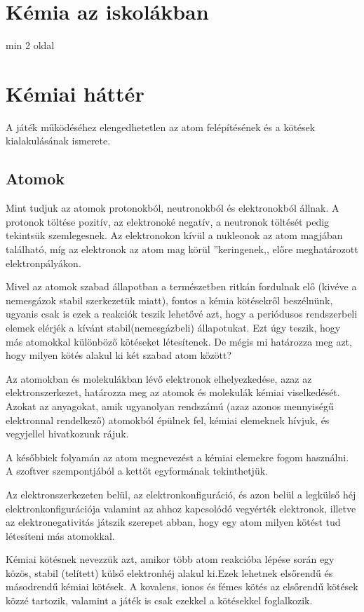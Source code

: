 \documentclass[colorlinks]{thesis-ekf}
\theoremstyle{definition}
\theoremstyle{remark}
\begin{document}
\chapter{Kémia az iskolákban}

min 2 oldal

\chapter{Kémiai háttér}

A játék működéséhez elengedhetetlen az atom felépítésének és a kötések kialakulásának ismerete. 
\section{Atomok}

Mint tudjuk az atomok protonokból, neutronokból és elektronokból állnak. A protonok töltése pozitív, az elektronoké negatív, a neutronok töltését pedig tekintsük szemlegesnek. Az elektronokon kívül a nukleonok az atom magjában található, míg az elektronok az atom mag körül ''keringenek,, előre meghatározott
elektronpályákon. 

Mivel az atomok szabad állapotban a természetben ritkán fordulnak elő (kivéve a nemesgázok stabil szerkezetük miatt), fontos a kémia kötésekről beszélnünk, ugyanis csak is ezek a reakciók teszik lehetővé azt, hogy a periódusos rendszerbeli elemek elérjék a kívánt stabil(nemesgázbeli) állapotukat. Ezt úgy teszik, hogy más atomokkal különböző kötéseket létesítenek.\cite{ionos_vidi} De mégis mi határozza meg azt, hogy milyen kötés alakul ki két szabad atom között?

Az atomokban és molekulákban lévő elektronok elhelyezkedése, azaz az elektronszerkezet, határozza meg az atomok és molekulák kémiai viselkedését.\cite{wiki_e_szerk}
Azokat az anyagokat, amik ugyanolyan rendszámú (azaz azonos mennyiségű elektronnal rendelkező) atomokból épülnek fel, kémiai elemeknek hívjuk, és vegyjellel hivatkozunk rájuk.\cite{periodusos_ppt} 

A későbbiek folyamán az atom megnevezést a kémiai elemekre fogom használni. A szoftver szempontjából a kettőt egyformának tekinthetjük.

Az elektronszerkezeten belül, az elektronkonfiguráció, és azon belül a legkülső héj elektronkonfigurációja valamint az ahhoz kapcsolódó vegyérték elektronok, illetve az elektronegativitás játszik szerepet abban, hogy egy atom milyen kötést tud létesíteni más atomokkal. 

Kémiai kötésnek nevezzük azt, amikor több atom reakcióba lépése során egy közös, stabil (telített) külső elektronhéj alakul ki.Ezek lehetnek elsőrendű és másodrendű kémiai kötések. A kovalens, ionos és fémes kötés az elsőrendű kötések közzé tartozik\cite{miskolc_kemia}, valamint a játék is csak ezekkel a kötésekkel foglalkozik.
\end{document}
